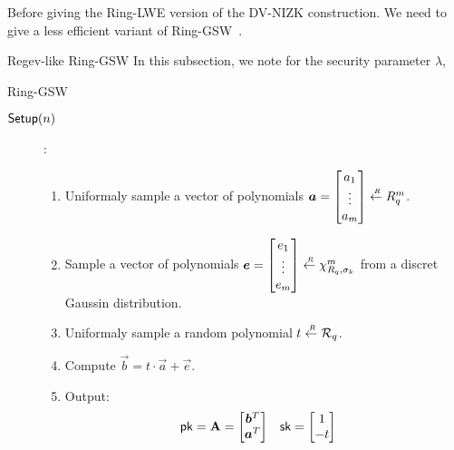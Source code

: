 
Before giving the Ring-LWE version of the DV-NIZK construction.
We need to give a less efficient variant of Ring-GSW~\cite{DBLP:journals/tc/KhedrGV16}.

\begin{subsection}{Regev-like Ring-GSW}
  In this subsection, we note for the security parameter $\lambda$,
  \begin{paragraph}{Ring-GSW}
    \begin{description}
    \item[${\mathsf{Setup}}(n)$]:
      \begin{enumerate}
      \item Uniformaly sample a vector of polynomials $\vec{a} = \begin{bmatrix} a_1 \\ \vdots \\ a_m \end{bmatrix} \sample R_q^m$.
      \item Sample a vector of polynomials $\vec{e} = \begin{bmatrix} e_1 \\ \vdots \\ e_m \end{bmatrix} \sample \chi_{R_q, \sigma_k}^m$ from a discret Gaussin distribution.
      \item Uniformaly sample a random polynomial $t \stackrel{{\scriptscriptstyle \mkern4mu R}}{\gets} {\mathcal{R}}_q$.
      \item Compute $\vec{b} = t \cdot \vec{a} + \vec{e}$.
      \item Output:
        \begin{align*}
          \pk &= \mat{A} = \begin{bmatrix} \vec{b}^T \\ \vec{a}^T \end{bmatrix} & \sk &= \begin{bmatrix} 1 \\ -t\end{bmatrix}

\end{align*}
\end{enumerate}
\end{description}
\end{paragraph}
\end{subsection}
